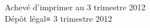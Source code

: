 \cleardoublepage
\mbox{}
\vfill

{\scriptsize
\begin{center}
Achevé d'imprimer au 3 trimestre 2012 \\
Dépôt légal≡ 3 trimestre 2012
\end{center}
}
\enlargethispage{\footskip}


